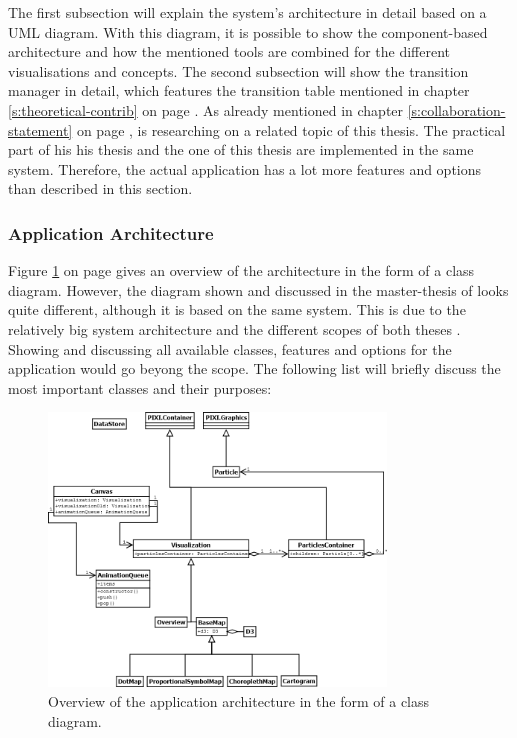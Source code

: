 The first subsection will explain the system's architecture in detail based on a \ac{UML} diagram. With this diagram, it is possible to show the component-based architecture and how the mentioned tools are combined for the different visualisations and concepts. The second subsection will show the transition manager in detail, which features the transition table mentioned in chapter \ref{s:theoretical-contrib} on page \pageref{s:theoretical-contrib}.
As already mentioned in chapter \ref{s:collaboration-statement} on page \pageref{s:collaboration-statement}, \citeauthor{Wanko2016} is researching on a related topic of this thesis. The practical part of his his thesis and the one of this thesis are implemented in the same system. Therefore, the actual application has a lot more features and options than described in this section.

\subsubsection{Application Architecture}
Figure \ref{fig:uml-practical-approach} on page \pageref{fig:uml-practical-approach} gives an overview of the architecture in the form of a class diagram. However, the diagram shown and discussed in the master-thesis of \citeauthor{Wanko2016} looks quite different, although it is based on the same system. This is due to the relatively big system architecture and the different scopes of both theses . Showing and discussing all available classes, features and options for the application would go beyong the scope. The following list will briefly discuss the most important classes and their purposes:

\begin{figure}[!htb]
\centering
\includegraphics[width=0.8\textwidth,keepaspectratio]{images/results/dia.png}
\caption[
    Overview of the application architecture in the form of a class diagram.
]{Overview of the application architecture in the form of a class diagram.}
\label{fig:uml-practical-approach}
\end{figure}

